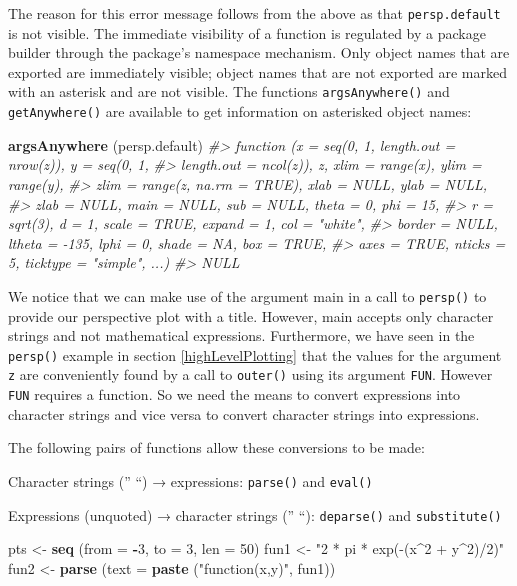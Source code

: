 \documentclass[
]{book}
\newenvironment{Shaded}{\begin{snugshade}}{\end{snugshade}}
\newcommand{\AttributeTok}[1]{\textcolor[rgb]{0.13,0.29,0.53}{#1}}
\newcommand{\CommentTok}[1]{\textcolor[rgb]{0.56,0.35,0.01}{\textit{#1}}}
\newcommand{\DecValTok}[1]{\textcolor[rgb]{0.00,0.00,0.81}{#1}}
\newcommand{\FunctionTok}[1]{\textcolor[rgb]{0.13,0.29,0.53}{\textbf{#1}}}
\newcommand{\NormalTok}[1]{#1}
\newcommand{\OtherTok}[1]{\textcolor[rgb]{0.56,0.35,0.01}{#1}}
\newcommand{\SpecialCharTok}[1]{\textcolor[rgb]{0.81,0.36,0.00}{\textbf{#1}}}
\newcommand{\StringTok}[1]{\textcolor[rgb]{0.31,0.60,0.02}{#1}}
\begin{document}
The reason for this error message follows from the above as that \texttt{persp.default} is not visible. The immediate visibility of a function is regulated by a package builder through the package's namespace mechanism. Only object names that are exported are immediately visible; object names that are not exported are marked with an asterisk and are not visible. The functions
\texttt{argsAnywhere()} and \texttt{getAnywhere()} are available to get information on asterisked object names:

\begin{Shaded}
\begin{Highlighting}[]
\FunctionTok{argsAnywhere}\NormalTok{ (persp.default)}
\CommentTok{\#\textgreater{} function (x = seq(0, 1, length.out = nrow(z)), y = seq(0, 1, }
\CommentTok{\#\textgreater{}     length.out = ncol(z)), z, xlim = range(x), ylim = range(y), }
\CommentTok{\#\textgreater{}     zlim = range(z, na.rm = TRUE), xlab = NULL, ylab = NULL, }
\CommentTok{\#\textgreater{}     zlab = NULL, main = NULL, sub = NULL, theta = 0, phi = 15, }
\CommentTok{\#\textgreater{}     r = sqrt(3), d = 1, scale = TRUE, expand = 1, col = "white", }
\CommentTok{\#\textgreater{}     border = NULL, ltheta = {-}135, lphi = 0, shade = NA, box = TRUE, }
\CommentTok{\#\textgreater{}     axes = TRUE, nticks = 5, ticktype = "simple", ...) }
\CommentTok{\#\textgreater{} NULL}
\end{Highlighting}
\end{Shaded}

We notice that we can make use of the argument main in a call to \texttt{persp()} to provide our perspective plot with a title. However, main accepts only character strings and not mathematical expressions. Furthermore, we have seen in the \texttt{persp()} example in section \ref{highLevelPlotting} that the values for the argument \texttt{z} are conveniently found by a call to \texttt{outer()} using its argument \texttt{FUN}. However \texttt{FUN} requires a function. So we need the means to convert expressions into character strings and vice versa to convert character strings into expressions.

The following pairs of functions allow these conversions to be made:

Character strings ('' ``) → expressions: \texttt{parse()} and \texttt{eval()}

Expressions (unquoted) → character strings ('' ``): \texttt{deparse()} and \texttt{substitute()}

\begin{Shaded}
\begin{Highlighting}[]
\NormalTok{pts }\OtherTok{\textless{}{-}} \FunctionTok{seq}\NormalTok{ (}\AttributeTok{from =} \SpecialCharTok{{-}}\DecValTok{3}\NormalTok{, }\AttributeTok{to =} \DecValTok{3}\NormalTok{, }\AttributeTok{len =} \DecValTok{50}\NormalTok{)}
\NormalTok{fun1 }\OtherTok{\textless{}{-}} \StringTok{"2 * pi * exp({-}(x\^{}2 + y\^{}2)/2)"}
\NormalTok{fun2 }\OtherTok{\textless{}{-}} \FunctionTok{parse}\NormalTok{ (}\AttributeTok{text =} \FunctionTok{paste}\NormalTok{ (}\StringTok{"function(x,y)"}\NormalTok{, fun1))}
\end{Highlighting}
\end{Shaded}
\end{document}
